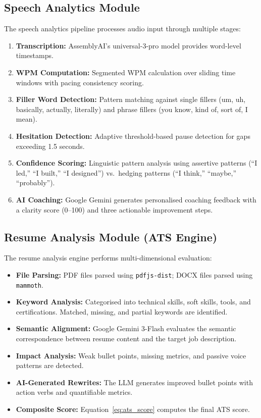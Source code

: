\documentclass[12pt,a4paper,oneside]{report}
\begin{document}
\subsection{Speech Analytics Module}
The speech analytics pipeline processes audio input through multiple stages:

\begin{enumerate}
  \item \textbf{Transcription:} AssemblyAI's universal-3-pro model provides word-level timestamps.
  \item \textbf{WPM Computation:} Segmented WPM calculation over sliding time windows with pacing consistency scoring.
  \item \textbf{Filler Word Detection:} Pattern matching against single fillers (um, uh, basically, actually, literally) and phrase fillers (you know, kind of, sort of, I mean).
  \item \textbf{Hesitation Detection:} Adaptive threshold-based pause detection for gaps exceeding 1.5 seconds.
  \item \textbf{Confidence Scoring:} Linguistic pattern analysis using assertive patterns (``I led,'' ``I built,'' ``I designed'') vs.\ hedging patterns (``I think,'' ``maybe,'' ``probably'').
  \item \textbf{AI Coaching:} Google Gemini generates personalised coaching feedback with a clarity score (0--100) and three actionable improvement steps.
\end{enumerate}

\subsection{Resume Analysis Module (ATS Engine)}
The resume analysis engine performs multi-dimensional evaluation:

\begin{itemize}
  \item \textbf{File Parsing:} PDF files parsed using \texttt{pdfjs-dist}; DOCX files parsed using \texttt{mammoth}.
  \item \textbf{Keyword Analysis:} Categorised into technical skills, soft skills, tools, and certifications. Matched, missing, and partial keywords are identified.
  \item \textbf{Semantic Alignment:} Google Gemini 3-Flash evaluates the semantic correspondence between resume content and the target job description.
  \item \textbf{Impact Analysis:} Weak bullet points, missing metrics, and passive voice patterns are detected.
  \item \textbf{AI-Generated Rewrites:} The LLM generates improved bullet points with action verbs and quantifiable metrics.
  \item \textbf{Composite Score:} Equation~\eqref{eq:ats_score} computes the final ATS score.
\end{itemize}
\end{document}
